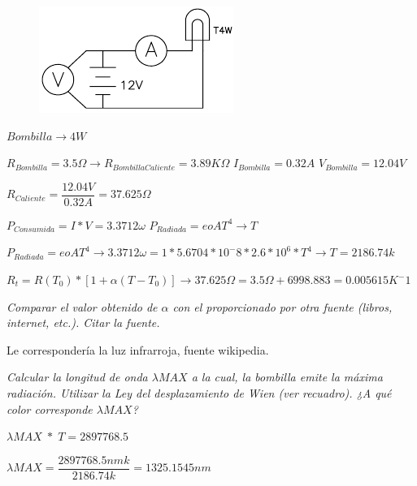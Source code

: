 \documentclass[paper=a4, fontsize=11pt]{scrartcl} %
\numberwithin{equation}{section} %
\numberwithin{figure}{section} %
\numberwithin{table}{section} %
\begin{document}
\begin{figure}[h]
	\centering
	\includegraphics[scale=1]{image/bombilla}
\end{figure}

$ Bombilla \rightarrow 4W $ \newline

$ R_{Bombilla}=3.5 \Omega \rightarrow R_{Bombilla Caliente} = 3.89K \Omega $ \newline
$I_{Bombilla} = 0.32A $ \newline
$V_{Bombilla}=12.04V$ \newline

$R_{Caliente} = \dfrac{12.04V}{0.32A} = 37.625 \Omega $ \newline

$P_{Consumida}=I*V=3.3712 \omega $ \newline
$P_{Radiada}=eoAT^4 \rightarrow T$ \newline

$P_{Radiada}=eoAT^4 \rightarrow 3.3712 \omega = 1* 5.6704 * 10^-8 * 2.6 * 10^6 * T^4 \rightarrow T=2186.74 k$ \newline

$R_{t} = R(T_{0}) * [1+ \alpha (T - T_{0})] \rightarrow 37.625 \Omega = 3.5 \Omega + 6998.883=0.005615K^-1 $ \newpage

\textit{Comparar el valor obtenido de $\alpha$ con el proporcionado por otra fuente (libros, internet, etc.). Citar la fuente.} \newline

Le correspondería la luz infrarroja, fuente wikipedia. \newline

\textit{Calcular la longitud de onda $ \lambda MAX $ a la cual, la bombilla emite la máxima radiación. Utilizar la Ley del desplazamiento de Wien (ver recuadro). ¿A qué color corresponde $ \lambda MAX $?} \newline

$ \lambda MAX \; * \; T=2897768.5 $ \newline

$ \lambda MAX= \dfrac {2897768.5nmk}{2186.74k} =  1325.1545nm$ \newline
\end{document}

